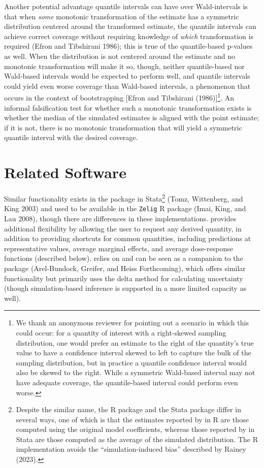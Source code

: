 Another potential advantage quantile intervals can have over Wald-intervals is that when \emph{some} monotonic transformation of the estimate has a symmetric distribution centered around the transformed estimate, the quantile intervals can achieve correct coverage without requiring knowledge of \emph{which} transformation is required (Efron and Tibshirani 1986); this is true of the quantile-based p-values as well. When the distribution is not centered around the estimate and no monotonic transformation will make it so, though, neither quantile-based nor Wald-based intervals would be expected to perform well, and quantile intervals could yield even worse coverage than Wald-based intervals, a phenomenon that occurs in the context of bootstrapping {[}Efron and Tibshirani (1986){]}\footnote{We thank an anonymous reviewer for pointing out a scenario in which this could occur: for a quantity of interest with a right-skewed sampling distribution, one would prefer an estimate to the right of the quantity's true value to have a confidence interval skewed to left to capture the bulk of the sampling distribution, but in practice a quantile confidence interval would also be skewed to the right. While a symmetric Wald-based interval may not have adequate coverage, the quantile-based interval could perform even worse.}. An informal falsification test for whether such a monotonic transformation exists is whether the median of the simulated estimates is aligned with the point estimate; if it is not, there is no monotonic transformation that will yield a symmetric quantile interval with the desired coverage.

\section{Related Software}\label{related-software}

Similar functionality exists in the  package in Stata\footnote{Despite the similar name, the R package  and the Stata package  differ in several ways, one of which is that the estimates reported by  in R are those computed using the original model coefficients, whereas those reported by  in Stata are those computed as the average of the simulated distribution. The R implementation avoids the ``simulation-induced bias'' described by Rainey (2023).} (Tomz, Wittenberg, and King 2003) and used to be available in the \texttt{Zelig} R package (Imai, King, and Lau 2008), though there are differences in these implementations.  provides additional flexibility by allowing the user to request any derived quantity, in addition to providing shortcuts for common quantities, including predictions at representative values, average marginal effects, and average dose-response functions (described below).  relies on and can be seen as a companion to the  package (Arel-Bundock, Greifer, and Heiss Forthcoming), which offers similar functionality but primarily uses the delta method for calculating uncertainty (though simulation-based inference is supported in a more limited capacity as well).

